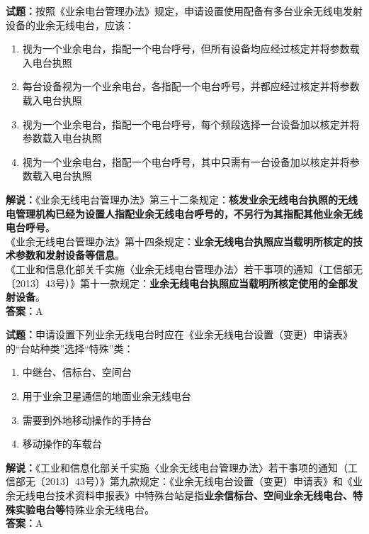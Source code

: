 \documentclass{ctexbook}
\begin{document}
\bigskip


\noindent\textbf{试题：}按照《业余电台管理办法》规定，申请设置使用配备有多台业余无线电发射设备的业余无线电台，应该：
\begin{enumerate}[leftmargin=3em]
\item 视为一个业余电台，指配一个电台呼号，但所有设备均应经过核定并将参数载入电台执照
\item 每台设备视为一个业余电台，各指配一个电台呼号，并都应经过核定并将参数载入电台执照
\item 视为一个业余电台，指配一个电台呼号，每个频段选择一台设备加以核定并将参数载入电台执照
\item 视为一个业余电台，指配一个电台呼号，其中只需有一台设备加以核定并将参数载入电台执照
\end{enumerate}
\noindent\textbf{解说：}《业余无线电台管理办法》第三十二条规定：\textbf{核发业余无线电台执照的无线电管理机构已经为设置人指配业余无线电台呼号的，不另行为其指配其他业余无线电台呼号}。\\
《业余无线电台管理办法》第十四条规定：\textbf{业余无线电台执照应当载明所核定的技术参数和发射设备等信息}。\\
《工业和信息化部关千实施〈业余无线电台管理办法〉若干事项的通知（工信部无〔2013〕43号）》第十一款规定：\textbf{业余无线电台执照应当载明所核定使用的全部发射设备}。\\\noindent\textbf{答案：}A


\bigskip


\noindent\textbf{试题：}申请设置下列业余无线电台时应在《业余无线电台设置（变更）申请表》 的“台站种类”选择“特殊”类：
\begin{enumerate}[leftmargin=3em]
\item 中继台、信标台、空间台
\item 用于业余卫星通信的地面业余无线电台
\item 需要到外地移动操作的手持台
\item 移动操作的车载台
\end{enumerate}
\noindent\textbf{解说：}《工业和信息化部关千实施〈业余无线电台管理办法〉若干事项的通知（工信部无〔2013〕43号）》第九款规定：《业余无线电台设置（变更）申请表》和《业余无线电台技术资料申报表》中特殊台站是指\textbf{业余信标台、空间业余无线电台、特殊实验电台等}特殊业余无线电台。\\\noindent\textbf{答案：}A




\bigskip
\end{document}
